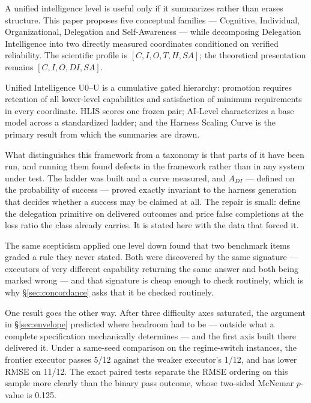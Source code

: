 A unified intelligence level is useful only if it summarizes rather than erases structure. This paper proposes five conceptual families --- Cognitive, Individual, Organizational, Delegation and Self-Awareness --- while decomposing Delegation Intelligence into two directly measured coordinates conditioned on verified reliability. The scientific profile is $[C, I, O, T, H, SA]$; the theoretical presentation remains $[C, I, O, DI, SA]$.

Unified Intelligence U0--U\Om{} is a cumulative gated hierarchy: promotion requires retention of all lower-level capabilities and satisfaction of minimum requirements in every coordinate. HLIS scores one frozen pair; AI-Level characterizes a base model across a standardized ladder; and the Harness Scaling Curve is the primary result from which the summaries are drawn.

What distinguishes this framework from a taxonomy is that parts of it have been run, and running them found defects in the framework rather than in any system under test. The ladder was built and a curve measured, and $A_{DI}$ --- defined on the probability of success --- proved exactly invariant to the harness generation that decides whether a success may be claimed at all. The repair is small: define the delegation primitive on delivered outcomes and price false completions at the loss ratio the class already carries. It is stated here with the data that forced it.

The same scepticism applied one level down found that two benchmark items graded a rule they never stated. Both were discovered by the same signature --- executors of very different capability returning the same answer and both being marked wrong --- and that signature is cheap enough to check routinely, which is why \S\ref{sec:concordance} asks that it be checked routinely.

One result goes the other way. After three difficulty axes saturated, the argument in \S\ref{sec:envelope} predicted where headroom had to be --- outside what a complete specification mechanically determines --- and the first axis built there delivered it. Under a same-seed comparison on the regime-switch instances, the frontier executor passes 5/12 against the weaker executor's 1/12, and has lower RMSE on 11/12. The exact paired tests separate the RMSE ordering on this sample more clearly than the binary pass outcome, whose two-sided McNemar $p$-value is 0.125.

